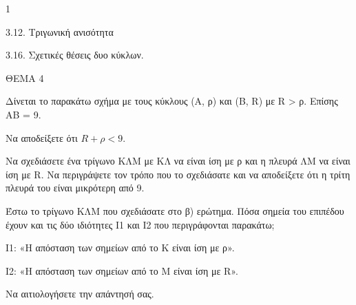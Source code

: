 \begin{ylh}{1}
    \item 3.12. Τριγωνική ανισότητα
    \item 3.16. Σχετικές θέσεις δυο κύκλων.
\end{ylh}

ΘΕΜΑ 4

Δίνεται το παρακάτω σχήμα με τους κύκλους (Α, ρ) και (Β, R) με R \textgreater{} ρ. Επίσης ΑΒ = 9.

\begin{alist}
\item Να αποδείξετε ότι $R + \rho < 9$. 

\item Να σχεδιάσετε ένα τρίγωνο ΚΛΜ με ΚΛ να είναι ίση με ρ και η πλευρά ΛΜ να είναι ίση με R. Να περιγράψετε τον τρόπο που το σχεδιάσατε και να αποδείξετε ότι η τρίτη πλευρά του είναι μικρότερη από 9.


\item Έστω το τρίγωνο ΚΛΜ που σχεδιάσατε στο β) ερώτημα. Πόσα σημεία του επιπέδου έχουν και τις δύο ιδιότητες Ι1 και Ι2 που περιγράφονται παρακάτω;

Ι1: «Η απόσταση των σημείων από το Κ είναι ίση με ρ».

Ι2: «Η απόσταση των σημείων από το Μ είναι ίση με R».

Να αιτιολογήσετε την απάντησή σας.



\end{alist}
